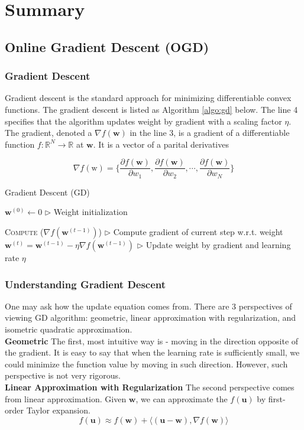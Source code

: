 \documentclass[11pt]{article}
\begin{document}
\section{Summary}
\subsection{Online Gradient Descent (OGD)}
\subsubsection{Gradient Descent}
\normalfont
Gradient descent \cite{gd1847} is the standard approach for minimizing differentiable convex functions. The gradient descent is listed as Algorithm \ref{algo:gd} below. The line 4 specifies that the algorithm updates weight by gradient with a scaling factor $\eta$. The gradient, denoted a $\nabla f(\textbf{w})$ in the line 3, is a gradient of a differentiable function $f: \mathbb{R}^N \rightarrow \mathbb{R}$ at $\textbf{w}$. It is a vector of a parital derivatives

$$\nabla f(\text{w}) = \{ \frac{\partial f(\textbf{w})}{\partial w_1},  \frac{\partial f(\textbf{w})}{\partial w_2}, \cdots, \frac{\partial f(\textbf{w})}{\partial w_N} \}$$



\begin{algorithm}[H]
\caption{Gradient Descent (GD)}
\label{algo:gd}
\begin{algorithmic}[1]
\STATE $\textbf{w}^{(0)} \leftarrow 0$ \hfill $\triangleright$ Weight initialization

\STATE \textsc{Compute} ($\nabla f(\textbf{w}^{(t-1)})$) \hfill $\triangleright$ Compute gradient of current step w.r.t. weight
\STATE $\textbf{w}^{(t)} = \textbf{w}^{(t-1)} - \eta \nabla f(\textbf{w}^{(t-1)})$ \hfill $\triangleright$ Update weight by gradient and learning rate $\eta$
\ENDFOR
\end{algorithmic}
\end{algorithm}

\subsubsection{Understanding Gradient Descent}
One may ask how the update equation comes from. There are 3 perspectives of viewing GD algorithm: geometric, linear approximation with regularization, and isometric quadratic approximation. \\
\textbf{Geometric   }
The first, most intuitive way is - moving in the direction opposite of the gradient. It is easy to say that when the learning rate is sufficiently small, we could minimize the function value by moving in such direction. However, such perspective is not very rigorous.\\
\textbf{Linear Approximation with Regularization   }
The second perspective comes from linear approximation. Given $\textbf{w}$, we can approximate the $f(\textbf{u})$ by first-order Taylor expansion.
$$f(\textbf{u}) \approx f(\textbf{w}) + \langle (\textbf{u} - \textbf{w}), \nabla f(\textbf{w}) \rangle$$
\end{document}

